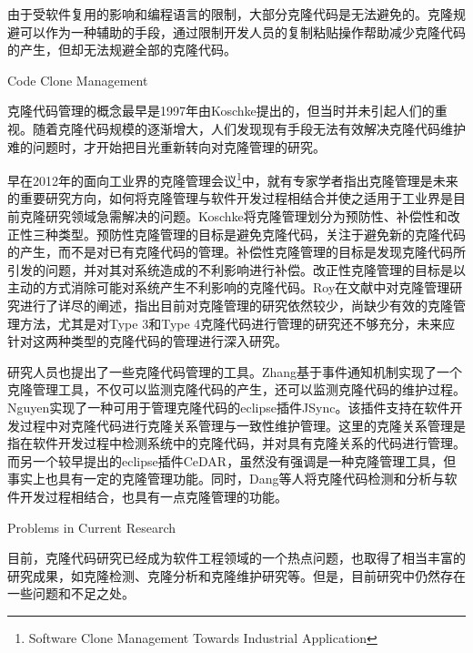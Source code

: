 由于受软件复用的影响和编程语言的限制，大部分克隆代码是无法避免的。克隆规避可以作为一种辅助的手段，通过限制开发人员的复制粘贴操作帮助减少克隆代码的产生，但却无法规避全部的克隆代码。


{Code Clone Management}

克隆代码管理的概念最早是1997年由Koschke提出的\cite{koschke2008frontiers}，但当时并未引起人们的重视。随着克隆代码规模的逐渐增大，人们发现现有手段无法有效解决克隆代码维护难的问题时，才开始把目光重新转向对克隆管理的研究。

早在2012年的面向工业界的克隆管理会议\footnote{Software Clone Management Towards Industrial Application}中，就有专家学者指出克隆管理是未来的重要研究方向，如何将克隆管理与软件开发过程相结合并使之适用于工业界是目前克隆研究领域急需解决的问题\cite{koschke2012software}。Koschke将克隆管理划分为预防性、补偿性和改正性三种类型\cite{koschke2008frontiers}。预防性克隆管理的目标是避免克隆代码，关注于避免新的克隆代码的产生，而不是对已有克隆代码的管理。补偿性克隆管理的目标是发现克隆代码所引发的问题，并对其对系统造成的不利影响进行补偿。改正性克隆管理的目标是以主动的方式消除可能对系统产生不利影响的克隆代码。Roy在文献\cite{roy2014vision}中对克隆管理研究进行了详尽的阐述，指出目前对克隆管理的研究依然较少，尚缺少有效的克隆管理方法，尤其是对Type 3和Type 4克隆代码进行管理的研究还不够充分，未来应针对这两种类型的克隆代码的管理进行深入研究。

研究人员也提出了一些克隆代码管理的工具。Zhang基于事件通知机制实现了一个克隆管理工具，不仅可以监测克隆代码的产生，还可以监测克隆代码的维护过程\cite{zhang2013towards}。Nguyen实现了一种可用于管理克隆代码的eclipse插件JSync\cite{nguyen2012clone}。该插件支持在软件开发过程中对克隆代码进行克隆关系管理与一致性维护管理。这里的克隆关系管理是指在软件开发过程中检测系统中的克隆代码，并对具有克隆关系的代码进行管理。而另一个较早提出的eclipse插件CeDAR\cite{tairas2012increasing}\cite{tairas2010representation}，虽然没有强调是一种克隆管理工具，但事实上也具有一定的克隆管理功能。同时，Dang等人将克隆代码检测和分析与软件开发过程相结合，也具有一点克隆管理的功能\cite{dang2017transferring}。

\cite{duala2008clonetracker}\cite{inoue2012experience}\cite{qu2014pattern}
\cite{bakota2007clone}\cite{hassan2009predicting}\cite{barbour2011late}
\cite{navarro2001guided}\cite{pearl1985bayesian}

{Problems in Current Research}

目前，克隆代码研究已经成为软件工程领域的一个热点问题，也取得了相当丰富的研究成果，如克隆检测、克隆分析和克隆维护研究等。但是，目前研究中仍然存在一些问题和不足之处。

